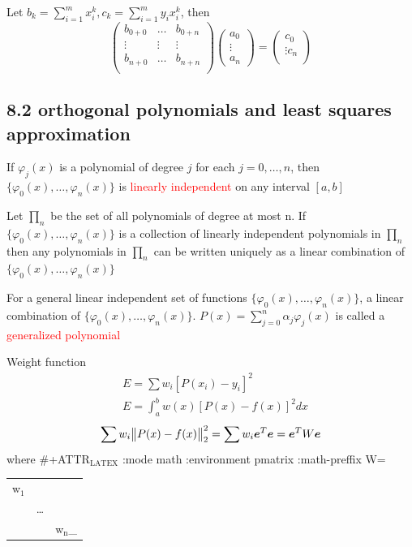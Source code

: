\documentclass[11pt]{article}
\begin{document}
Let \(b_k=\displaystyle\sum_{i=1}^m x_i^k,
   c_k=\displaystyle\sum_{i=1}^my_ix_i^k\), then
\begin{equation*}
\begin{pmatrix}
b_{0+0} & \dots & b_{0+n}\\
\vdots & \vdots&\vdots\\
b_{n+0} & \dots & b_{n+n}\\
\end{pmatrix}
\begin{pmatrix}
a_0\\
\vdots\\
a_n
\end{pmatrix}=
\begin{pmatrix}
c_0\\
\vdots
c_n\\
\end{pmatrix}
\end{equation*}
\subsection{8.2 orthogonal polynomials and least squares approximation}
\label{sec:org8517d1f}
\begin{theorem}
If $\varphi_j(x)$ is a polynomial of degree $j$ for each $j=0,\dots,n$, then 
$\{\varphi_0(x),\dots,\varphi_n(x)\}$ is \textcolor{red}{linearly independent} on
any interval $[a,b]$
\end{theorem}

\begin{theorem}
Let $\prod_n$ be the set of all polynomials of degree at most n. If
$\{\varphi_0(x),\dots,\varphi_n(x)\}$ is a collection of linearly independent
polynomials in $\prod_n$ then any polynomials in $\prod_n$ can be written
uniquely as a linear combination of $\{\varphi_0(x),\dots,\varphi_n(x)\}$
\end{theorem}

\begin{definition}
For a general linear independent set of functions $\{\varphi_0(x),\dots,\varphi_n(x)\}$,
a linear combination of $\{\varphi_0(x),\dots,\varphi_n(x)\}$.
$P(x)=\displaystyle\sum_{j=0}^n\alpha_j\varphi_j(x)$ is called a
\textcolor{red}{generalized polynomial} 
\end{definition}


Weight function
\begin{align*}
&E=\sum w_i[P(x_i)-y_i]^2\\
&E=\int_a^bw(x)[P(x)-f(x)]^2dx
\end{align*}
\begin{equation*}
\sum w_i\norm{P(x)-f(x)}_2^2=\sum w_i\boldsymbol{e}^T\boldsymbol{e}=\boldsymbol{e}^TW\boldsymbol{e}
\end{equation*}
where
\#+ATTR\(_{\text{LATEX}}\) :mode math :environment pmatrix :math-preffix W=
\begin{center}
\begin{tabular}{lll}
w\(_{\text{1}}\) &  & \\
 & \dots{} & \\
 &  & w\(_{\text{n}}\)\_\\
\end{tabular}
\end{center}
\end{document}

